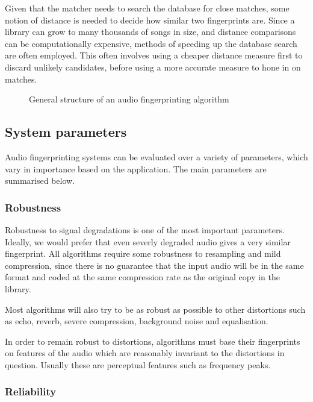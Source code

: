 \documentclass[12pt,a4paper,twoside,openright]{report}
\begin{document}
Given that the matcher needs to search the database for close matches, some notion of distance is needed to decide how similar two fingerprints are. Since a library can grow to many thousands of songs in size, and distance comparisons can be computationally expensive, methods of speeding up the database search are often employed. This often involves using a cheaper distance measure first to discard unlikely candidates, before using a more accurate measure to hone in on matches.


\begin{figure}[h]
  \centering
  
  \caption{General structure of an audio fingerprinting algorithm}
\end{figure}


\subsection{System parameters}
\label{section:systemparams}

Audio fingerprinting systems can be evaluated over a variety of parameters, which vary in importance based on the application. The main parameters are summarised below.

\subsubsection{Robustness}

Robustness to signal degradations is one of the most important parameters. Ideally, we would prefer that even severly degraded audio gives a very similar fingerprint. All algorithms require some robustness to resampling and mild compression, since there is no guarantee that the input audio will be in the same format and coded at the same compression rate as the original copy in the library.

Most algorithms will also try to be as robust as possible to other distortions such as echo, reverb, severe compression, background noise and equalisation.

In order to remain robust to distortions, algorithms must base their fingerprints on features of the audio which are reasonably invariant to the distortions in question. Usually these are perceptual features such as frequency peaks.

\subsubsection{Reliability}
\end{document}
